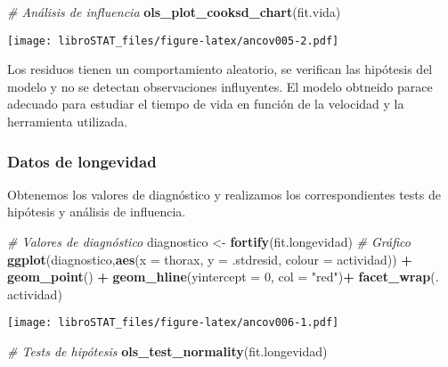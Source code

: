 \documentclass[
]{book}
\newenvironment{Shaded}{\begin{snugshade}}{\end{snugshade}}
\newcommand{\CommentTok}[1]{\textcolor[rgb]{0.56,0.35,0.01}{\textit{#1}}}
\newcommand{\DataTypeTok}[1]{\textcolor[rgb]{0.13,0.29,0.53}{#1}}
\newcommand{\DecValTok}[1]{\textcolor[rgb]{0.00,0.00,0.81}{#1}}
\newcommand{\KeywordTok}[1]{\textcolor[rgb]{0.13,0.29,0.53}{\textbf{#1}}}
\newcommand{\NormalTok}[1]{#1}
\newcommand{\OperatorTok}[1]{\textcolor[rgb]{0.81,0.36,0.00}{\textbf{#1}}}
\newcommand{\StringTok}[1]{\textcolor[rgb]{0.31,0.60,0.02}{#1}}
\theoremstyle{definition}
\theoremstyle{definition}
\theoremstyle{definition}
\theoremstyle{remark}
\begin{document}
\begin{Shaded}
\begin{Highlighting}[]
\CommentTok{# Análisis de influencia}
\KeywordTok{ols_plot_cooksd_chart}\NormalTok{(fit.vida)}
\end{Highlighting}
\end{Shaded}

\texttt{[image: libroSTAT\_files/figure-latex/ancov005-2.pdf]}

Los residuos tienen un comportamiento aleatorio, se verifican las hipótesis del modelo y no se detectan observaciones influyentes. El modelo obtneido parace adecuado para estudiar el tiempo de vida en función de la velocidad y la herramienta utilizada.

\hypertarget{datos-de-longevidad-1}{%
\subsubsection{Datos de longevidad}\label{datos-de-longevidad-1}}

Obtenemos los valores de diagnóstico y realizamos los correspondientes tests de hipótesis y análisis de influencia.

\begin{Shaded}
\begin{Highlighting}[]
\CommentTok{# Valores de diagnóstico}
\NormalTok{diagnostico <-}\StringTok{ }\KeywordTok{fortify}\NormalTok{(fit.longevidad)}
\CommentTok{# Gráfico}
\KeywordTok{ggplot}\NormalTok{(diagnostico,}\KeywordTok{aes}\NormalTok{(}\DataTypeTok{x =}\NormalTok{ thorax, }\DataTypeTok{y =}\NormalTok{ .stdresid, }\DataTypeTok{colour =}\NormalTok{ actividad)) }\OperatorTok{+}\StringTok{ }
\StringTok{   }\KeywordTok{geom_point}\NormalTok{() }\OperatorTok{+}
\StringTok{   }\KeywordTok{geom_hline}\NormalTok{(}\DataTypeTok{yintercept =} \DecValTok{0}\NormalTok{, }\DataTypeTok{col =} \StringTok{"red"}\NormalTok{)}\OperatorTok{+}
\StringTok{   }\KeywordTok{facet_wrap}\NormalTok{(. }\OperatorTok{~}\StringTok{ }\NormalTok{actividad)}
\end{Highlighting}
\end{Shaded}

\texttt{[image: libroSTAT\_files/figure-latex/ancov006-1.pdf]}

\begin{Shaded}
\begin{Highlighting}[]
\CommentTok{# Tests de hipótesis}
\KeywordTok{ols_test_normality}\NormalTok{(fit.longevidad)}
\end{Highlighting}
\end{Shaded}
\end{document}
